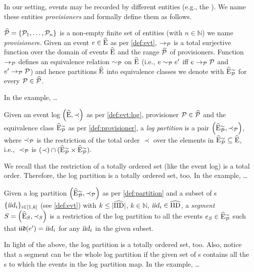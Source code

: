 \begin{newj}
In our setting, events may be recorded by different entities (e.g., the ). We name these entities \emph{provisioners} and formally define them as follows.
\begin{definition}[Provisioner]\label{def:provisioner}
	$\widehat{\mathcal{P}} = \{ \mathcal{P}_1, \ldots, \mathcal{P}_n \}$ is a non-empty finite set of entities (with $n \in \mathbb{N}$) we name \emph{provisioner}s. 
	Given an event $e \in \widehat{\mathrm{E}}$ as per \cref{def:evt}, $\to_{\mathcal{P}}$ is a total surjective function over the domain of events $\widehat{\mathrm{E}}$ and the range $\widehat{\mathcal{P}}$ of provisioners. Function $\to_{\mathcal{P}}$ defines an equivalence relation $\sim_{\mathcal{P}}$ on $\widehat{\mathrm{E}}$ (i.e., $e \sim_{\mathcal{P}} e'$ iff $e \to_{\mathcal{P}} \mathcal{P}$ and $e' \to_{\mathcal{P}} \mathcal{P}$) and hence partitions $\widehat{\mathrm{E}}$ into equivalence classes we denote with $\widehat{\mathrm{E}}^{\sim}_{\mathcal{P}}$ for every $\mathcal{P} \in \widehat{\mathcal{P}}$.
\end{definition}
%
In the example, \ldots{}

\begin{definition}\label{def:partition}
	Given an event log $\left( \widehat{\mathrm{E}}, \prec \right)$ as per \cref{def:evt:log}, provisioner $\mathcal{P} \in \widehat{\mathcal{P}}$ and the equivalence class $\widehat{\mathrm{E}}^{\sim}_{\mathcal{P}}$ as per \cref{def:provisioner}, a \emph{log partition} is a pair $\left( \widehat{\mathrm{E}}^{\sim}_{\mathcal{P}}, \prec_{\mathcal{P}} \right)$, where $\prec_{\mathcal{P}}$ is the restriction of the total order $\prec$ over the elements in $\widehat{\mathrm{E}}^{\sim}_{\mathcal{P}} \subseteq \widehat{\mathrm{E}}$, i.e., $\;\prec_{\mathcal{P}}$ is $(\prec) \cap (\widehat{\mathrm{E}}^{\sim}_{\mathcal{P}} \times \widehat{\mathrm{E}}^{\sim}_{\mathcal{P}})$.
\end{definition}
%
We recall that the restriction of a totally ordered set (like the event log) is a total order. Therefore, the log partition is a totally ordered set, too. In the example, \ldots{}

\begin{definition}[Segment]\label{def:segment}
	Given a log partition $\left( \widehat{\mathrm{E}}^{\sim}_{\mathcal{P}}, \prec_{\mathcal{P}} \right)$ as per \cref{def:partition} and a subset of {\CId}s $\{\textrm{\textsl{iid}}_i\}_{i \in [1,k]}$ (see \cref{def:evt}) with $k \leq |\widehat{\mathrm{IID}}|$, $k \in \mathbb{N}$, $\textrm{\textsl{iid}}_i \in \widehat{\mathrm{IID}}$, a \emph{segment} $S = \left( \widehat{\mathrm{E}}_{S}, \prec_{S} \right)$ is a restriction of the log partition to all the events $e_{S} \in \widehat{\mathrm{E}}^{\sim}_{\mathcal{P}}$ such that $\mathfrak{iid}(e') = \textrm{\textsl{iid}}_i$ for any $\textrm{\textsl{iid}}_i$ in the given subset. 
\end{definition}
%
In light of the above, the log partition is a totally ordered set, too. Also, notice that a segment can be the whole log partition if the given set of {\CId}s contains all the {\CId}s to which the events in the log partition map. In the example, \ldots{}



\end{newj}
